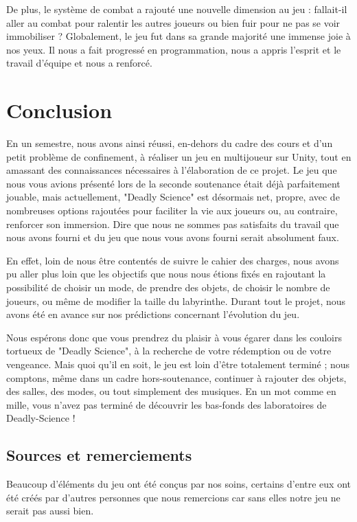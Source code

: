 \documentclass{article}
\begin{document}
De plus, le système de combat a rajouté une nouvelle dimension au jeu : fallait-il aller au combat pour ralentir les autres joueurs ou bien fuir pour ne pas se voir immobiliser ? Globalement, le jeu fut dans sa grande majorité une immense joie à nos yeux. Il nous a fait progressé en programmation, nous a appris l'esprit et le travail d'équipe et nous a renforcé.

\newpage
\section{Conclusion}

En un semestre, nous avons ainsi réussi, en-dehors du cadre des cours et d'un petit problème de confinement, à réaliser un jeu en multijoueur sur Unity, tout en amassant des connaissances nécessaires à l'élaboration de ce projet. Le jeu que nous vous avions présenté lors de la seconde soutenance était déjà parfaitement jouable, mais actuellement, "Deadly Science" est désormais net, propre, avec de nombreuses options rajoutées pour faciliter la vie aux joueurs ou, au contraire, renforcer son immersion. Dire que nous ne sommes pas satisfaits du travail que nous avons fourni et du jeu que nous vous avons fourni serait absolument faux.

En effet, loin de nous être contentés de suivre le cahier des charges, nous avons pu aller plus loin que les objectifs que nous nous étions fixés en rajoutant la possibilité de choisir un mode, de prendre des objets, de choisir le nombre de joueurs, ou même de modifier la taille du labyrinthe. Durant tout le projet, nous avons été en avance sur nos prédictions concernant l'évolution du jeu.

Nous espérons donc que vous prendrez du plaisir à vous égarer dans les couloirs tortueux de "Deadly Science", à la recherche de votre rédemption ou de votre vengeance. Mais quoi qu'il en soit, le jeu est loin d'être totalement terminé ; nous comptons, même dans un cadre hors-soutenance, continuer à rajouter des objets, des salles, des modes, ou tout simplement des musiques. En un mot comme en mille, vous n'avez pas terminé de découvrir les bas-fonds des laboratoires de Deadly-Science !

\subsection{Sources et remerciements}

Beaucoup d'éléments du jeu ont été conçus par nos soins, certains d'entre eux ont été créés par d'autres personnes que nous remercions car sans elles notre jeu ne serait pas aussi bien.
\end{document}
